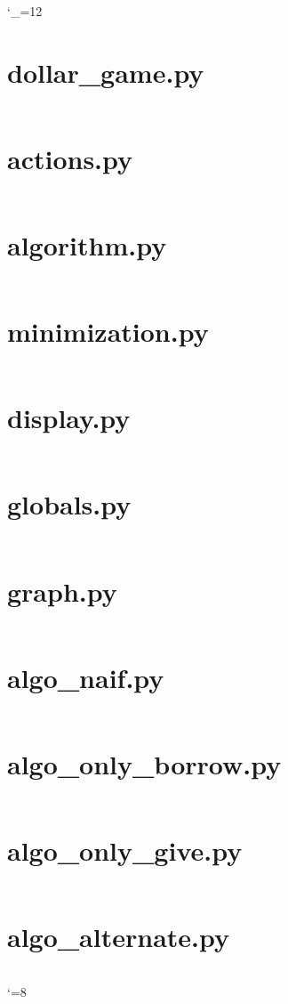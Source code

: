 \documentclass{article}
\begin{document}

\catcode`_=12

\section*{dollar_game.py		}\inputminted[linenos, breaklines, breakautoindent]{python}{dollar_game.py}\newpage    
\section*{actions.py			}\inputminted[linenos, breaklines, breakautoindent]{python}{actions.py}\newpage        
\section*{algorithm.py			}\inputminted[linenos, breaklines, breakautoindent]{python}{algorithm.py}\newpage      
\section*{minimization.py		}\inputminted[linenos, breaklines, breakautoindent]{python}{minimization.py}\newpage
\section*{display.py			}\inputminted[linenos, breaklines, breakautoindent]{python}{display.py}\newpage
\section*{globals.py			}\inputminted[linenos, breaklines, breakautoindent]{python}{globals.py}\newpage
\section*{graph.py				}\inputminted[linenos, breaklines, breakautoindent]{python}{graph.py}\newpage
\section*{algo_naif.py			}\inputminted[linenos, breaklines, breakautoindent]{python}{algo_naive.py}\newpage
\section*{algo_only_borrow.py	}\inputminted[linenos, breaklines, breakautoindent]{python}{algo_only_borrow.py}\newpage
\section*{algo_only_give.py		}\inputminted[linenos, breaklines, breakautoindent]{python}{algo_only_give.py}\newpage
\section*{algo_alternate.py		}\inputminted[linenos, breaklines, breakautoindent]{python}{algo_alternate.py}\newpage

\catcode`=8
	
\end{document}
